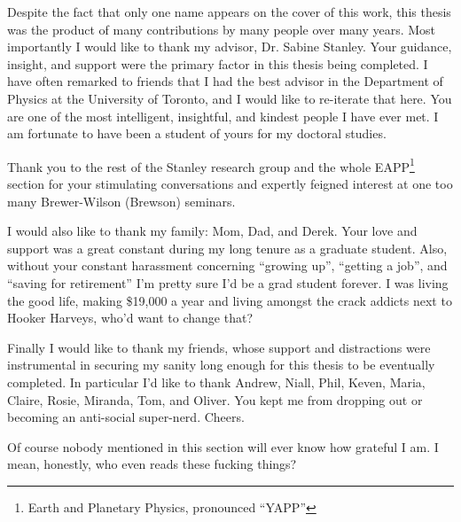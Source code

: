 
\begin{acknowledgements}
Despite the fact that only one name appears on the cover of this work, this thesis was the product of many contributions by many people over many years. Most importantly I would like to thank my advisor, Dr. Sabine Stanley. Your guidance, insight, and support were the primary factor in this thesis being completed. I have often remarked to friends that I had the best advisor in the Department of Physics at the University of Toronto, and I would like to re-iterate that here. You are one of the most intelligent, insightful, and kindest people I have ever met. I am fortunate to have been a student of yours for my doctoral studies.

Thank you to the rest of the Stanley research group and the whole EAPP\footnote{Earth and Planetary Physics, pronounced ``YAPP''} section for your stimulating conversations and expertly feigned interest at one too many Brewer-Wilson (Brewson) seminars.

I would also like to thank my family: Mom, Dad, and Derek. Your love and support was a great constant during my long tenure as a graduate student. Also, without your constant harassment concerning ``growing up'', ``getting a job'', and ``saving for retirement'' I'm pretty sure I'd be a grad student forever. I was living the good life, making \$19,000 a year and living amongst the crack addicts next to Hooker Harveys, who'd want to change that?

Finally I would like to thank my friends, whose support and distractions were instrumental in securing my sanity long enough for this thesis to be eventually completed. In particular I'd like to thank Andrew, Niall, Phil, Keven, Maria, Claire, Rosie, Miranda, Tom, and Oliver. You kept me from dropping out or becoming an anti-social super-nerd. Cheers.

Of course nobody mentioned in this section will ever know how grateful I am. I mean, honestly, who even reads these fucking things?

\end{acknowledgements}
